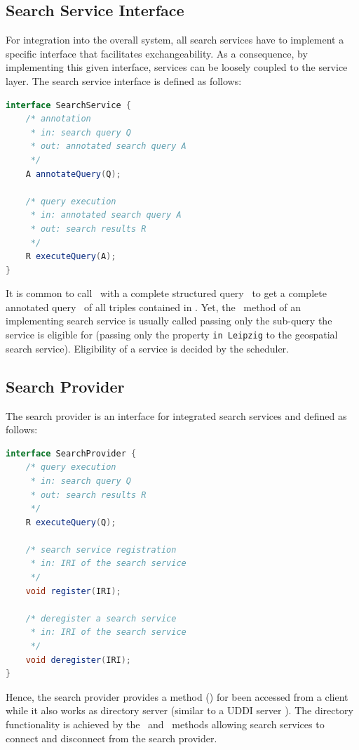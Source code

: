 \subsection{Search Service Interface}
For integration into the overall system, all search services have to implement a specific interface that facilitates exchangeability.
As a consequence, by implementing this given interface, services can be loosely coupled to the service layer.
The search service interface is defined as follows:
\begin{lstlisting}[language=Java]
interface SearchService {
    /* annotation
     * in: search query Q
     * out: annotated search query A
     */ 
    A annotateQuery(Q);
    
    /* query execution 
     * in: annotated search query A
     * out: search results R
     */
    R executeQuery(A);
}
\end{lstlisting}
It is common to call \ with a complete structured query \ to get a complete annotated query \ of all triples contained in .
Yet, the \ method of an implementing search service is usually called passing only the sub-query the service is eligible for (\eg passing only the property \texttt{in Leipzig} to the geospatial search service).
Eligibility of a service is decided by the scheduler.

\subsection{Search Provider}
The search provider is an interface for integrated search services and defined as follows:
\begin{lstlisting}[language=Java]
interface SearchProvider {
    /* query execution 
     * in: search query Q
     * out: search results R
     */
    R executeQuery(Q);
    
    /* search service registration 
     * in: IRI of the search service
     */
    void register(IRI);
    
    /* deregister a search service  
     * in: IRI of the search service
     */
    void deregister(IRI);
}
\end{lstlisting}
Hence, the search provider provides a method () for been accessed from a client while it also works as directory server (similar to a UDDI server \cite{UDDI}).
The directory functionality is achieved by the \ and \ methods allowing search services to connect and disconnect from the search provider.


